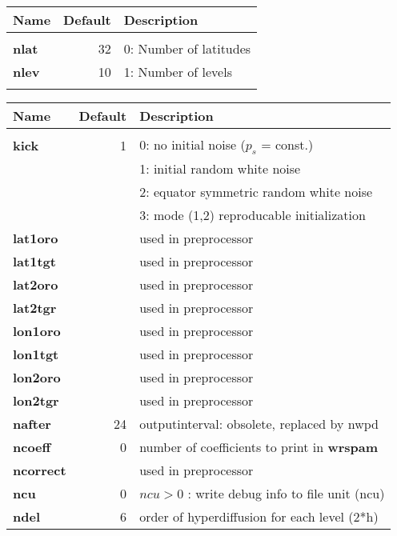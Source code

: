 \begin{tabular}{|l|r|l|}                                  
\hline                                                        
Name   & Default & Description \\
\hline
& & \\
{\bf nlat    } &  32 & 0: Number of latitudes \\
{\bf nlev    } &  10 & 1: Number of levels    \\
& & \\
\hline                                                        
\end{tabular}



\newpage
\begin{tabular}{|l|r|l|}                                  
\hline                                                        
Name   & Default & Description \\
\hline
& & \\
{\bf kick    } &  1 & 0: no initial noise ($p_s$ = const.) \\
{\bf         } &    & 1: initial random white noise        \\
{\bf         } &    & 2: equator symmetric random white noise   \\
{\bf         } &    & 3: mode (1,2) reproducable initialization \\
{\bf lat1oro } &    & used in preprocessor \\
{\bf lat1tgt } &    & used in preprocessor \\
{\bf lat2oro } &    & used in preprocessor \\
{\bf lat2tgr } &    & used in preprocessor \\
{\bf lon1oro } &    & used in preprocessor \\
{\bf lon1tgt } &    & used in preprocessor \\
{\bf lon2oro } &    & used in preprocessor \\
{\bf lon2tgr } &    & used in preprocessor \\
{\bf nafter  } & 24 & outputinterval: obsolete, replaced by nwpd \\
{\bf ncoeff  } &  0 & number of coefficients to print in {\bf wrspam} \\  
{\bf ncorrect} &    & used in preprocessor \\
{\bf ncu     } &  0 & $ncu > 0$ : write debug info to file unit (ncu) \\
{\bf ndel    } &  6 & order of hyperdiffusion for each level (2*h) \\

\end{tabular}
